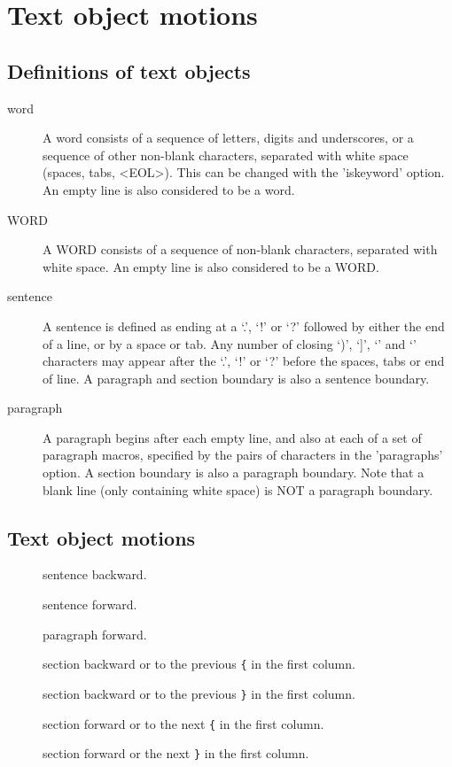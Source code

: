 \documentclass{article}
\newcommand{\syntax}[1]{\PVerb{#1}}
\begin{document}
\section{Text object motions}
\subsection{Definitions of text objects}
\begin{description}
  \item[word] A word consists of a sequence of letters, digits and underscores, or a sequence of other non-blank characters, separated with white space (spaces, tabs, <EOL>).  This can be changed with the 'iskeyword' option.  An empty line is also considered to be a word.
  \item[WORD] A WORD consists of a sequence of non-blank characters, separated with white space.  An empty line is also considered to be a WORD.
  \item[sentence] A sentence is defined as ending at a `.', `!' or `?' followed by either the end of a line, or by a space or tab.  Any number of closing `)', `]', `\syntax{"}' and `\syntax{'}' characters may appear after the `.', `!' or `?' before the spaces, tabs or end of line.  A paragraph and section boundary is also a sentence boundary.
  \item[paragraph] A paragraph begins after each empty line, and also at each of a set of paragraph macros, specified by the pairs of characters in the 'paragraphs' option. A section boundary is also a paragraph boundary. Note that a blank line (only containing white space) is NOT a paragraph boundary.
\end{description}
\subsection{Text object motions}
\begin{description}
  \item[\PVerb{(}] sentence backward.
  \item[\PVerb{)}] sentence forward.
  \item[\PVerb{{}] paragraph backward.
  \item[\PVerb{}}] paragraph forward.
  \item[\PVerb{[[}] section backward or to the previous \verb|{| in the first column.
  \item[\PVerb{[]}] section backward or to the previous \verb|}| in the first column.
  \item[\PVerb{]]}] section forward or to the next \verb|{| in the first column.
  \item[\PVerb{][}] section forward or the next \verb|}| in the first column.
\end{description}
\end{document}
